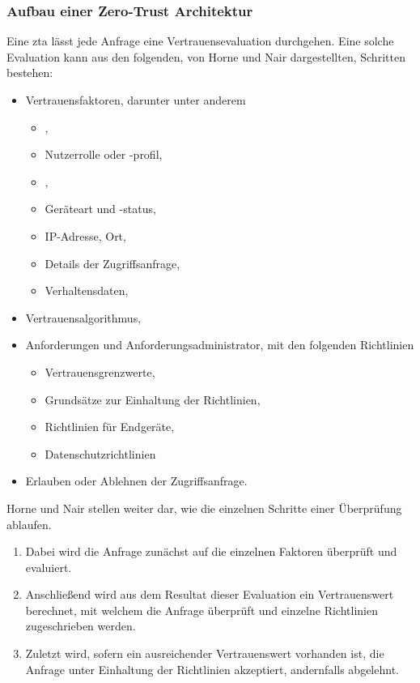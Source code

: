 \subsubsection{Aufbau einer Zero-Trust Architektur}

Eine \gls{zta} lässt jede Anfrage eine Vertrauensevaluation durchgehen.
Eine solche Evaluation kann aus den folgenden, von Horne und Nair\autocite[\vglf][]{horne-2021} dargestellten, Schritten bestehen:
\begin{itemize}
    \item Vertrauensfaktoren, darunter unter anderem
    \begin{itemize}
        \item {},
        \item Nutzerrolle oder -profil,
        \item {},
        \item Geräteart und -status,
        \item IP-Adresse, \bzw Ort,
        \item Details der Zugriffsanfrage,
        \item Verhaltensdaten,
    \end{itemize}
    \item Vertrauensalgorithmus,
    \item Anforderungen und Anforderungsadministrator, mit den folgenden Richtlinien
    \begin{itemize}
        \item Vertrauensgrenzwerte,
        \item Grundsätze zur Einhaltung der Richtlinien,
        \item Richtlinien für Endgeräte,
        \item Datenschutzrichtlinien
    \end{itemize}
    \item Erlauben oder Ablehnen der Zugriffsanfrage.
\end{itemize}
Horne und Nair stellen weiter dar, wie die einzelnen Schritte einer Überprüfung ablaufen.\autocite[\vglf][]{horne-2021}
\begin{enumerate}
    \item Dabei wird die Anfrage zunächst auf die einzelnen Faktoren überprüft und evaluiert.
    \item Anschließend wird aus dem Resultat dieser Evaluation ein Vertrauenswert berechnet, mit welchem die Anfrage überprüft und einzelne Richtlinien zugeschrieben werden.
    \item Zuletzt wird, sofern ein ausreichender Vertrauenswert vorhanden ist, die Anfrage unter Einhaltung der Richtlinien akzeptiert, andernfalls abgelehnt.
\end{enumerate}

